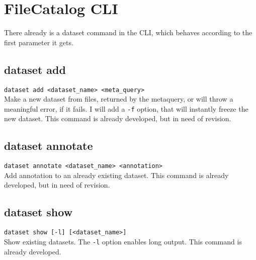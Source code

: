 \documentclass{scrreprt}
\begin{document}
\section{FileCatalog CLI}
There already is a dataset command in the CLI, which behaves according to the first parameter it gets. 

\subsection{dataset add}
\texttt{dataset add <dataset_name> <meta_query>} \\
Make a new dataset from files, returned by the metaquery, or will throw a meaningful error, if it fails.  I will add a \texttt{-f} option, that will instantly freeze the new dataset. This command is already developed, but in need of revision.

%

\subsection{dataset annotate} 
\texttt{dataset annotate <dataset_name> <annotation>}  \\
Add annotation to an already existing dataset. This command is already developed, but in need of revision.

\subsection{dataset show}
\texttt{dataset show [-l] [<dataset_name>]} \\
Show existing datasets. The \texttt{-l} option enables long output. This command is already developed.
               
\end{document}
